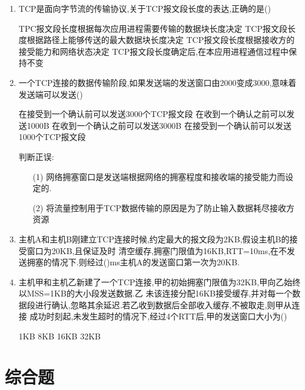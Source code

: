 \documentclass[12pt, a4paper, oneside, UTF8]{ctexbook}
\begin{document}
\begin{enumerate}
    \item TCP是面向字节流的传输协议,关于TCP报文段长度的表达,正确的是(\qquad)
    \begin{choices}[1]
        \task TPC报文段长度根据每次应用进程需要传输的数据块长度决定
        \task TCP报文段长度根据路径上能够传送的最大数据块长度决定
        \task TCP报文段长度根据接收方的接受能力和网络状态决定
        \task TCP报文段长度确定后,在本应用进程通信过程中保持不变
    \end{choices}

    \item 一个TCP连接的数据传输阶段,如果发送端的发送窗口由2000变成3000,意味着发送端可以发送(\qquad)
    \begin{choices}[1]
        \task 在接受到一个确认前可以发送3000个TCP报文段
        \task 在收到一个确认之前可以发送1000B
        \task 在收到一个确认之前可以发送3000B
        \task 在接受到一个确认前可以发送1000个TCP报文段
    \end{choices}

    判断正误:
    \begin{enumerate}
        \item [(1)] 网络拥塞窗口是发送端根据网络的拥塞程度和接收端的接受能力而设定的. 
        \item [(2)] 将流量控制用于TCP数据传输的原因是为了防止输入数据耗尽接收方资源
    \end{enumerate}

    \item 主机A和主机B刚建立TCP连接时候,约定最大的报文段为2KB,假设主机B的接受窗口为20KB,且保证及时
    清空缓存,拥塞门限值为16KB,RTT=10ms,在不发送拥塞的情况下.则经过(\qquad)ms主机A的发送窗口第一次为20KB.

    \item 主机甲和主机乙新建了一个TCP连接,甲的初始拥塞门限值为32KB,甲向乙始终以MSS=1KB的大小段发送数据.乙
    未该连接分配16KB接受缓存,并对每一个数据段进行确认,忽略其余延迟.若乙收到数据后全部收入缓存,不被取走,则甲从连接
    成功时刻起,未发生超时的情况下,经过4个RTT后,甲的发送窗口大小为(\qquad)
    \begin{choices}
        \task 1KB
        \task 8KB
        \task 16KB
        \task 32KB
    \end{choices}
\end{enumerate}


\section{综合题}
\end{document}
